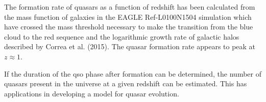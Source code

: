 \documentclass[12pt, twocolumn]{revtex4}    %
\begin{document}
The formation rate of quasars as a function of redshift has been calculated from the mass function of galaxies in the EAGLE Ref-L0100N1504 simulation which have crossed the mass threshold necessary to make the transition from the blue cloud to the red sequence and the logarithmic growth rate of galactic halos described by Correa et al. (2015). The quasar formation rate appears to peak at $z\approx1$.\par

If the duration of the qso phase after formation can be determined, the number of quasars present in the universe at a given redshift can be estimated. This has applications in developing a model for quasar evolution.



\end{document}
